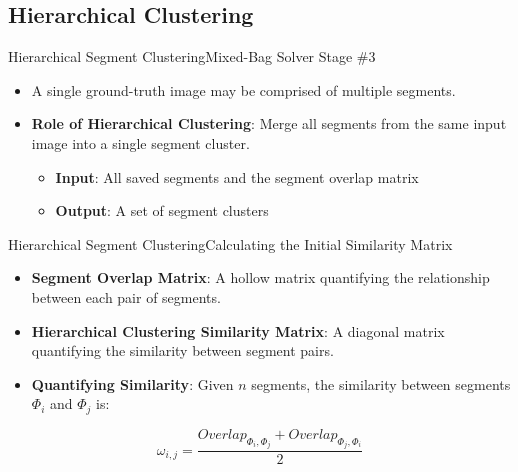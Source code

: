 \documentclass[handout,10pt]{beamer}  %
\begin{document}
\subsection{Hierarchical Clustering}
\begin{frame}{Hierarchical Segment Clustering}{Mixed-Bag Solver Stage \#3}
  \begin{itemize}
    \item A single ground-truth image may be comprised of multiple segments.
    \vfill
    \item \textbf{Role of Hierarchical Clustering}: Merge all segments from the same input image into a single segment cluster.
    \begin{itemize}
      \vspace{0.4em}
      \item \textbf{Input}: All saved segments and the segment overlap matrix
  		\vspace{0.6em}
      \item \textbf{Output}: A set of segment clusters
    \end{itemize}
  \end{itemize}
\end{frame}



\begin{frame}{Hierarchical Segment Clustering}{Calculating the Initial Similarity Matrix}
  \begin{itemize}
    \item \textbf{Segment Overlap Matrix}: A hollow matrix quantifying the relationship between each pair of segments.
    \vspace{1em}
    \item \textbf{Hierarchical Clustering Similarity Matrix}: A diagonal matrix quantifying the similarity between segment pairs.
    \vspace{1em}
    \item \textbf{Quantifying Similarity}: Given $n$ segments, the similarity between segments $\Phi_i$ and $\Phi_j$ is:
  \end{itemize}
  \vspace{-1.5em}
  \begin{center}
    \begin{equation}
      \omega_{i,j} = \frac{Overlap_{\Phi_i, \Phi_j} + Overlap_{\Phi_j, \Phi_i}}{2} 
    \end{equation}
  \end{center}  
\end{frame}
\end{document}

